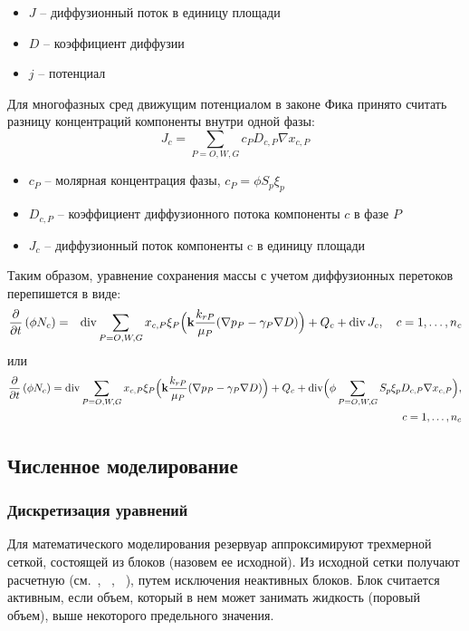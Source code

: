 \documentclass[12pt,a4paper]{article}
\def\Div{\mathop{\rm div}\nolimits}
\begin{document}
\begin{itemize}
\item $J$ -- диффузионный поток в единицу площади
\item $D$ -- коэффициент диффузии
\item $j$ -- потенциал
\end{itemize}
Для многофазных сред движущим потенциалом в законе Фика принято считать разницу концентраций компоненты внутри одной фазы:
$$
J_c = \sum\limits_{P = O, W, G}{c_PD_{c,P}\nabla x_{c,P}}
$$
\begin{itemize}
\item $c_P$ -- молярная концентрация фазы, $c_P = \phi S_p\xi_p$
\item $D_{c,P}$ -- коэффициент диффузионного потока компоненты $c$ в фазе $P$
\item $J_c$ -- диффузионный поток компоненты c в единицу площади
\end{itemize}
Таким образом, уравнение сохранения массы с учетом диффузионных перетоков перепишется в виде:
\begin{eqnarray}
\dfrac{\partial}{\partial t} \left(\phi N_c\right) &=
  & \Div\sum\limits_{P = O, W, G} x_{c,P} \xi_P \Bigl({\bf k} \dfrac{k_{rP}}{\mu_P}(\nabla p_P - \gamma_P \nabla D)\Bigr)+Q_c+\Div{J_{c}}, \quad c=1,\dots,n_c \nonumber
\end{eqnarray}
или
\begin{eqnarray}
\dfrac{\partial}{\partial t} \left(\phi N_c\right) =
   \Div\sum\limits_{P = O, W, G} x_{c,P} \xi_P \Bigl({\bf k} \dfrac{k_{rP}}{\mu_P}(\nabla p_P - \gamma_P \nabla D)\Bigr) +Q_c+\Div\Bigl({\phi\sum\limits_{P = O, W, G}{S_p\xi_pD_{c,P}\nabla x_{c,P}}}\Bigr), \nonumber \\c=1,\dots,n_c \nonumber
\end{eqnarray}


\subsection{Численное моделирование}

\subsubsection{Дискретизация уравнений}
\label{numerical}
Для математического моделирования резервуар аппроксимируют трехмерной сеткой, состоящей из блоков (назовем ее исходной).  
Из исходной сетки получают расчетную (см.~\cite{Chen}, ~\cite{Aziz}, ~\cite{ClusterBalancingArticle}), путем исключения неактивных блоков.
Блок считается активным, если объем, 
который в нем может занимать жидкость (поровый объем), выше некоторого предельного значения. \\
\end{document}
